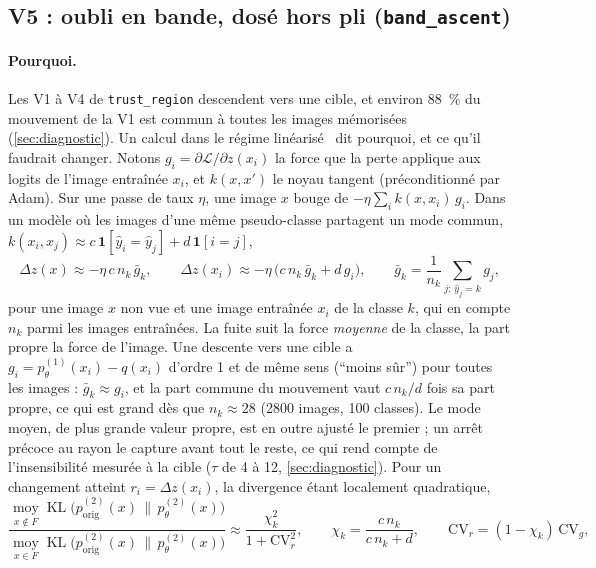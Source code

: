 \documentclass[11pt,a4paper]{article}
\newcommand{\KL}{\operatorname{KL}}
\newcommand{\Exp}{\operatorname*{moy}}
\newcommand{\orig}{\mathrm{orig}}
\newcommand{\code}[1]{\texttt{#1}}
\begin{document}
\subsection{V5 : oubli en bande, dosé hors pli (\code{band\_ascent})}\label{sec:v5}
\paragraph{Pourquoi.} Les V1 à V4 de \code{trust\_region} descendent vers une cible, et environ
\SI{88}{\percent} du mouvement de la V1 est commun à toutes les images mémorisées
(\cref{sec:diagnostic}). Un calcul dans le régime linéarisé~\cite{jacot2018ntk,ortizjimenez2023tangent}
dit pourquoi, et ce qu'il faudrait changer. Notons $g_i=\partial\mathcal L/\partial z(x_i)$ la force que
la perte applique aux logits de l'image entraînée $x_i$, et $k(x,x')$ le noyau tangent (préconditionné
par Adam). Sur une passe de taux $\eta$, une image $x$ bouge de $-\eta\sum_ik(x,x_i)\,g_i$. Dans un
modèle où les images d'une même pseudo-classe partagent un mode commun,
$k(x_i,x_j)\approx c\,\mathbf 1[\hat y_i=\hat y_j]+d\,\mathbf 1[i=j]$,
\begin{equation}\label{eq:v5lin}
  \Delta z(x)\approx-\eta\,c\,n_k\,\bar g_k,\qquad
  \Delta z(x_i)\approx-\eta\,\bigl(c\,n_k\,\bar g_k+d\,g_i\bigr),\qquad
  \bar g_k=\frac1{n_k}\sum_{j:\,\hat y_j=k}g_j,
\end{equation}
pour une image $x$ non vue et une image entraînée $x_i$ de la classe $k$, qui en compte $n_k$ parmi
les images entraînées. La fuite suit la force \emph{moyenne} de la classe, la part propre la force
de l'image. Une descente vers une cible a $g_i=p^{(1)}_\theta(x_i)-q(x_i)$ d'ordre 1 et de même sens
(\enquote{moins sûr}) pour toutes les images : $\bar g_k\approx g_i$, et la part commune du mouvement
vaut $c\,n_k/d$ fois sa part propre, ce qui est grand dès que $n_k\approx28$ (2800 images, 100 classes).
Le mode moyen, de plus grande valeur propre, est en outre ajusté le premier ; un arrêt précoce au rayon
le capture avant tout le reste, ce qui rend compte de l'insensibilité mesurée à la cible ($\tau$ de 4 à
12, \cref{sec:diagnostic}). Pour un changement atteint $r_i=\Delta z(x_i)$, la divergence étant
localement quadratique,
\begin{equation}\label{eq:v5ratio}
  \frac{\Exp_{x\notin F}\KL\bigl(p^{(2)}_\orig(x)\,\|\,p^{(2)}_\theta(x)\bigr)}
       {\Exp_{x\in F}\KL\bigl(p^{(2)}_\orig(x)\,\|\,p^{(2)}_\theta(x)\bigr)}
  \approx\frac{\chi_k^2}{1+\mathrm{CV}_r^2},\qquad \chi_k=\frac{c\,n_k}{c\,n_k+d},\qquad
  \mathrm{CV}_r=(1-\chi_k)\,\mathrm{CV}_g,
\end{equation}
\end{document}
